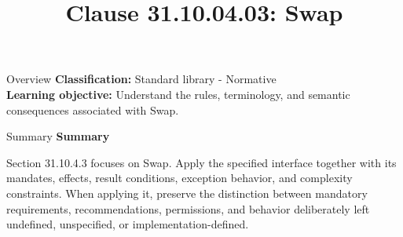 \documentclass[10pt,letterpaper]{article}
\title{Clause 31.10.04.03: Swap}
\author{}
\date{}
\begin{document}
\maketitle
\begin{CornellOverviewBox}{Overview}
\textbf{Classification:} Standard library - Normative\\[2pt]
\textbf{Learning objective:} Understand the rules, terminology, and semantic consequences associated with Swap.
\end{CornellOverviewBox}\begin{CornellSummaryBox}{Summary}
{\sffamily\bfseries\color{Accent} Summary}\par\vspace{3pt}Section 31.10.4.3 focuses on Swap. Apply the specified interface together with its mandates, effects, result conditions, exception behavior, and complexity constraints. When applying it, preserve the distinction between mandatory requirements, recommendations, permissions, and behavior deliberately left undefined, unspecified, or implementation-defined.
\end{CornellSummaryBox}
\end{document}
